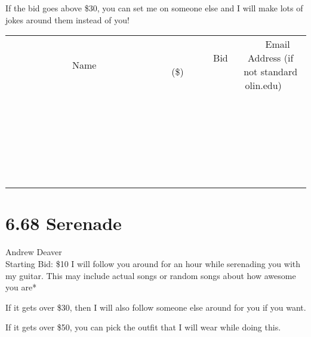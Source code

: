 \documentclass[11pt]{article}
\begin{document}
If the bid goes above \$30, you can set me on someone else and I will make lots of jokes around them instead of you!
\\[6ex]
\begin{tabular}{c c c}
~~~~~~~~~~~~~Name~~~~~~~~~~~~~ & ~~~~~~~~~Bid (\$)~~~~~~~~~  & ~~~Email Address (if not standard olin.edu)~~~\\
 & & \\
\hline
 & & \\
\hline
 & & \\
\hline
 & & \\
\hline
 & & \\
\hline
 & & \\
\hline
 & & \\
\hline
 & & \\
\hline
 & & \\
\hline
 & & \\
\hline
 & & \\
\hline
 & & \\
\hline
 & & \\
\hline
 & & \\
\hline
 & & \\
\hline
 & & \\
\hline
 & & \\
\hline
 & & \\
\hline
 & & \\
\hline
 & & \\
\hline
 & & \\
\hline
 & & \\
\hline
 & & \\
\hline
 & & \\
\hline
 & & \\
\hline
 & & \\
\hline
\end{tabular}
\newpage
\section*{6.68 Serenade}
Andrew Deaver
\\
Starting Bid: \$10
\newline
I will follow you around for an hour while serenading you with my guitar. This may include actual songs or random songs about how awesome you are*

If it gets over \$30, then I will also follow someone else around for you if you want.

If it gets over \$50, you can pick the outfit that I will wear while doing this.
\end{document}
